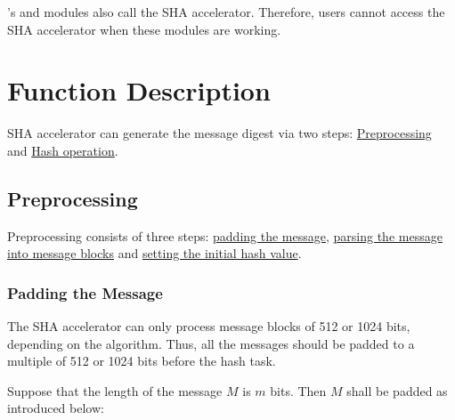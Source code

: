 \documentclass[main\_\_EN.tex]{subfiles}
\begin{document}
\begin{importantlisting}
\vspace{-0.5em}

    \chipname{}'s  and  modules also call the SHA accelerator. Therefore, users cannot access the SHA accelerator when these modules are working.
\end{importantlisting}

\section{Function Description}

SHA accelerator can generate the message digest via two steps: \hyperref[sec:sha-preprocessing]{Preprocessing} and  \hyperref[sec:sha-hash-operation]{Hash operation}.

\subsection{Preprocessing}\label{sec:sha-preprocessing}

Preprocessing consists of three steps: \hyperref[sec:sha-padding-msg]{padding the message}, \hyperref[sec:sha-parsing-msg]{parsing the message into message blocks} and \hyperref[sec:sha-set-initial-hash]{setting the initial hash value}.

\subsubsection{Padding the Message}\label{sec:sha-padding-msg}

The SHA accelerator can only process message blocks of 512 or 1024 bits, depending on the algorithm. Thus, all the messages should be padded to a multiple of 512 or 1024 bits before the hash task.

Suppose that the length of the message \begin{math}M\end{math} is \begin{math} m \end{math} bits. Then \begin{math} M \end{math} shall be padded as introduced below:
\end{document}
